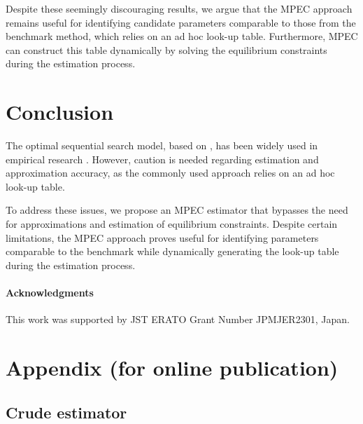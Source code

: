\documentclass[12pt]{article}
\begin{document}
Despite these seemingly discouraging results, we argue that the MPEC approach remains useful for identifying candidate parameters comparable to those from the benchmark method, which relies on an ad hoc look-up table. Furthermore, MPEC can construct this table dynamically by solving the equilibrium constraints during the estimation process.

\section{Conclusion}

The optimal sequential search model, based on \cite{weitzman1979optimal}, has been widely used in empirical research \citep{ursu2023sequential}. However, caution is needed regarding estimation and approximation accuracy, as the commonly used approach relies on an ad hoc look-up table.

To address these issues, we propose an MPEC estimator that bypasses the need for approximations and estimation of equilibrium constraints. Despite certain limitations, the MPEC approach proves useful for identifying parameters comparable to the benchmark while dynamically generating the look-up table during the estimation process.

\paragraph{Acknowledgments}
This work was supported by JST ERATO Grant Number JPMJER2301, Japan.




\newpage
\appendix
\section{Appendix (for online publication)}

\subsection{Crude estimator}
\end{document}
